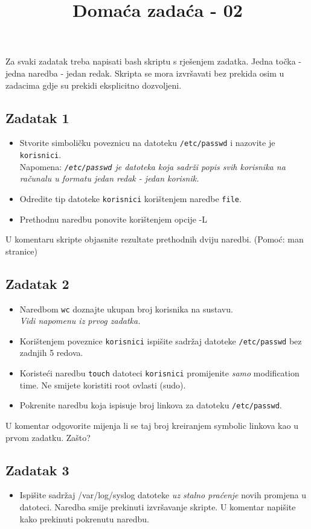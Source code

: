 \documentclass[12pt,a4paper]{article}
\newcommand{\shell}[1]{\texttt{#1}}
\begin{document}
	\title{Domaća zadaća - 02\vspace{-2em}}
	\maketitle
	Za svaki zadatak treba napisati bash skriptu s rješenjem zadatka. Jedna točka - jedna naredba - jedan redak. Skripta se mora izvršavati bez prekida osim u zadacima gdje su prekidi eksplicitno dozvoljeni.
	\subsection*{Zadatak 1}
	\begin{itemize}
		\item Stvorite simboličku poveznicu na datoteku \shell{/etc/passwd} i nazovite je \shell{korisnici}.\\
		 Napomena: \textit{\shell{/etc/passwd} je datoteka koja sadrži popis svih korisnika na računalu u formatu jedan redak - jedan korisnik.}
		\item Odredite tip datoteke \shell{korisnici} korištenjem naredbe \shell{file}.
		\item Prethodnu naredbu ponovite korištenjem opcije -L
	\end{itemize}
	U komentaru skripte objasnite rezultate prethodnih dviju naredbi. (Pomoć: man stranice)
	\subsection*{Zadatak 2}
	\begin{itemize}
		\item Naredbom \shell{wc} doznajte ukupan broj korisnika na sustavu.\\
		\textit{Vidi napomenu iz prvog zadatka.}
		\item Korištenjem poveznice \shell{korisnici} ispišite sadržaj datoteke \shell{/etc/passwd} bez zadnjih 5 redova.
		\item Koristeći naredbu \shell{touch} datoteci \shell{korisnici} promijenite \emph{samo} modification time. Ne smijete koristiti root ovlasti (sudo).
		\item Pokrenite naredbu koja ispisuje broj linkova za datoteku \shell{/etc/passwd}.
	\end{itemize}
	U komentar odgovorite mijenja li se taj broj kreiranjem symbolic linkova kao u prvom zadatku. Zašto?
	\subsection*{Zadatak 3}
	\begin{itemize}
		\item Ispišite sadržaj /var/log/syslog datoteke \emph{uz stalno praćenje} novih promjena u datoteci. Naredba smije prekinuti izvršavanje skripte. U komentar napišite kako prekinuti pokrenutu naredbu.
	\end{itemize}
\end{document}
